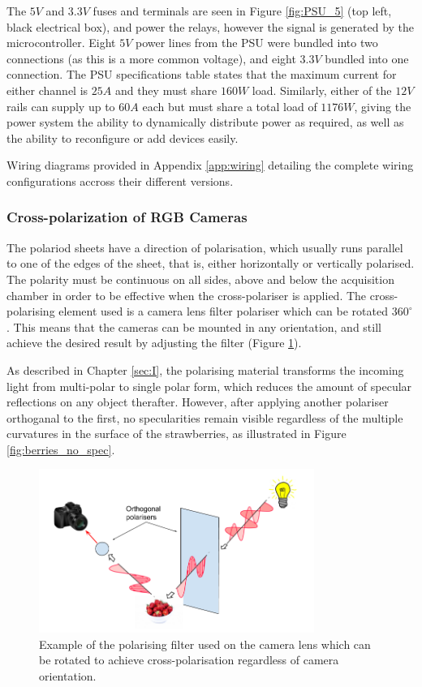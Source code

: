 \documentclass[fleqn,twoside]{article}
\begin{document}
The $5V$ and $3.3V$ fuses and terminals are seen in Figure \ref{fig:PSU_5} (top left, black electrical box), and power the relays, however the signal is generated by the microcontroller. Eight $5V$ power lines from the PSU were bundled into two connections (as this is a more common voltage), and eight $3.3V$ bundled into one connection. The PSU specifications table states that the maximum current for either channel is $25A$ and they must share $160W$ load. Similarly, either of the $12V$ rails can supply up to $60A$ each but must share a total load of $1176W$, giving the power system the ability to dynamically distribute power as required, as well as the ability to reconfigure or add devices easily.

Wiring diagrams provided in Appendix \ref{app:wiring} detailing the complete wiring configurations accross their different versions.



\subsubsection{Cross-polarization of RGB Cameras}


The polariod sheets have a direction of polarisation, which usually runs parallel to one of the edges of the sheet, that is, either horizontally or vertically polarised. The polarity must be continuous on all sides, above and below the acquisition chamber in order to be effective when the cross-polariser is applied. The cross-polarising element used is a camera lens filter polariser which can be rotated $360^{\circ}$. This means that the cameras can be mounted in any orientation, and still achieve the desired result by adjusting the filter (Figure \ref{fig:nd_filters}).


As described in Chapter \ref{sec:I}, the polarising material transforms the incoming light from multi-polar to single polar form, which reduces the amount of specular reflections on any object therafter. However, after applying another polariser orthoganal to the first, no specularities remain visible regardless of the multiple curvatures in the surface of the strawberries, as illustrated in Figure \ref{fig:berries_no_spec}. 

\begin{figure}[h]
	\centering
	\includegraphics[width=0.8\textwidth]{cross-polariser.png}
	\caption{Example of the polarising filter used on the camera lens which can be rotated to achieve cross-polarisation regardless of camera orientation.}
	\label{fig:nd_filters}
\end{figure}
\end{document}
